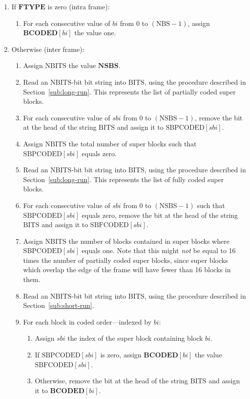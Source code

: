 \documentclass[9pt,letterpaper]{book}
\newcommand{\idx}[1]{{\ensuremath{\mathit{#1}}}}
\newcommand{\sbi}{\idx{sbi}}
\newcommand{\bi}{\idx{bi}}
\newcommand{\bitvar}[1]{\ensuremath{\mathbf{\bm{#1}}}}
\newcommand{\locvar}[1]{\ensuremath{\mathrm{#1}}}
\numberwithin{equation}{chapter}
\numberwithin{figure}{chapter}
\numberwithin{table}{chapter}
\begin{document}
\begin{enumerate}
\item
If \bitvar{FTYPE} is zero (intra frame):
\begin{enumerate}
\item
For each consecutive value of \locvar{\bi} from 0 to $(\locvar{NBS}-1)$, assign
 $\bitvar{BCODED}[\locvar{\bi}]$ the value one.
\end{enumerate}
\item
Otherwise (inter frame):
\begin{enumerate}
\item
Assign \locvar{NBITS} the value \bitvar{NSBS}.
\item
Read an \locvar{NBITS}-bit bit string into \locvar{BITS}, using the procedure
 described in Section~\ref{sub:long-run}.
This represents the list of partially coded super blocks.
\item
For each consecutive value of \locvar{\sbi} from 0 to $(\locvar{NSBS}-1)$,
 remove the bit at the head of the string \locvar{BITS} and assign it to
 $\locvar{SBPCODED}[\locvar{\sbi}]$.
\item
Assign \locvar{NBITS} the total number of super blocks such that \\
 $\locvar{SBPCODED}[\locvar{\sbi}]$ equals zero.
\item
Read an \locvar{NBITS}-bit bit string into \locvar{BITS}, using the procedure
 described in Section~\ref{sub:long-run}.
This represents the list of fully coded super blocks.
\item
For each consecutive value of \locvar{\sbi} from 0 to $(\locvar{NSBS}-1)$ such
 that $\locvar{SBPCODED}[\locvar{\sbi}]$ equals zero, remove the bit at the
 head of the string \locvar{BITS} and assign it to
 $\locvar{SBFCODED}[\locvar{\sbi}]$.
\item
Assign \locvar{NBITS} the number of blocks contained in super blocks where
 $\locvar{SBPCODED}[\locvar{\sbi}]$ equals one.
Note that this might {\em not} be equal to 16 times the number of partially
 coded super blocks, since super blocks which overlap the edge of the frame
 will have fewer than 16 blocks in them.
\item
Read an \locvar{NBITS}-bit bit string into \locvar{BITS}, using the procedure
 described in Section~\ref{sub:short-run}.
\item
For each block in coded order---indexed by \locvar{\bi}:
\begin{enumerate}
\item
Assign \locvar{\sbi} the index of the super block containing block
 \locvar{\bi}.
\item
If $\locvar{SBPCODED}[\locvar{\sbi}]$ is zero, assign
 $\bitvar{BCODED}[\locvar{\bi}]$ the value $\locvar{SBFCODED}[\locvar{\sbi}]$.
\item
Otherwise, remove the bit at the head of the string \locvar{BITS} and assign it
 to $\bitvar{BCODED}[\locvar{\bi}]$.
\end{enumerate}
\end{enumerate}
\end{enumerate}
\end{document}
